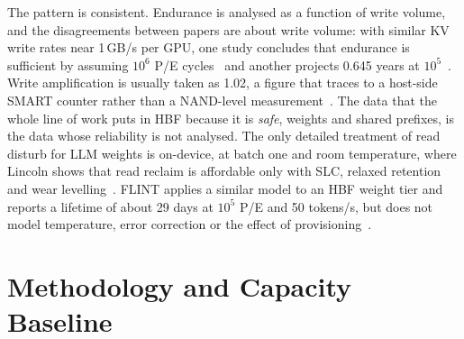 \documentclass[conference,10pt]{IEEEtran}
\begin{document}
The pattern is consistent. Endurance is analysed as a function of write volume,
and the disagreements between papers are about write volume: with similar KV
write rates near 1\,GB/s per GPU, one study concludes that endurance is
sufficient by assuming $10^{6}$ P/E cycles~\cite{wang2026flashaccel} and another
projects 0.645 years at $10^{5}$~\cite{kim2026dash}. Write amplification is
usually taken as 1.02, a figure that traces to a host-side SMART counter rather
than a NAND-level measurement~\cite{jeong2025hifc}. The data that the whole line
of work puts in HBF because it is \emph{safe}, weights and shared prefixes, is
the data whose reliability is not analysed. The only detailed treatment of read
disturb for LLM weights is on-device, at batch one and room temperature, where
Lincoln shows that read reclaim is affordable only with SLC, relaxed retention
and wear levelling~\cite{sun2025lincoln}. FLINT applies a similar model to an HBF
weight tier and reports a lifetime of about 29 days at $10^{5}$ P/E and 50
tokens/s, but does not model temperature, error correction or the effect of
provisioning~\cite{oliveira2026flint}.

\section{Methodology and Capacity Baseline}
\label{sec:capacity}
\end{document}
